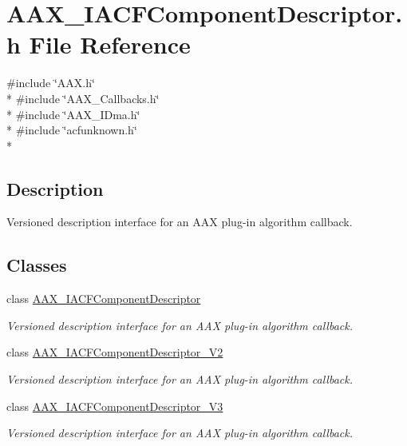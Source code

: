 \hypertarget{a00218}{}\section{A\+A\+X\+\_\+\+I\+A\+C\+F\+Component\+Descriptor.\+h File Reference}
\label{a00218}
{\ttfamily \#include \char`\"{}A\+A\+X.\+h\char`\"{}}\\*
{\ttfamily \#include \char`\"{}A\+A\+X\+\_\+\+Callbacks.\+h\char`\"{}}\\*
{\ttfamily \#include \char`\"{}A\+A\+X\+\_\+\+I\+Dma.\+h\char`\"{}}\\*
{\ttfamily \#include \char`\"{}acfunknown.\+h\char`\"{}}\\*


\subsection{Description}
Versioned description interface for an A\+A\+X plug-\/in algorithm callback. 

\subsection*{Classes}
\begin{DoxyCompactItemize}
\item 
class \hyperlink{a00050}{A\+A\+X\+\_\+\+I\+A\+C\+F\+Component\+Descriptor}
\begin{DoxyCompactList}\small\item\em Versioned description interface for an A\+A\+X plug-\/in algorithm callback. \end{DoxyCompactList}\item 
class \hyperlink{a00051}{A\+A\+X\+\_\+\+I\+A\+C\+F\+Component\+Descriptor\+\_\+\+V2}
\begin{DoxyCompactList}\small\item\em Versioned description interface for an A\+A\+X plug-\/in algorithm callback. \end{DoxyCompactList}\item 
class \hyperlink{a00052}{A\+A\+X\+\_\+\+I\+A\+C\+F\+Component\+Descriptor\+\_\+\+V3}
\begin{DoxyCompactList}\small\item\em Versioned description interface for an A\+A\+X plug-\/in algorithm callback. \end{DoxyCompactList}\end{DoxyCompactItemize}
